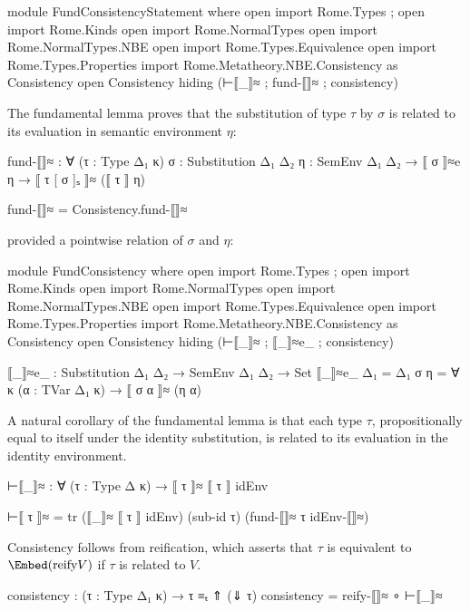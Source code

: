 \begin{AgdaAlign}
\begin{code}[hide] 
module FundConsistencyStatement where
  open import Rome.Types ; open import Rome.Kinds 
  open import Rome.NormalTypes
  open import Rome.NormalTypes.NBE
  open import Rome.Types.Equivalence
  open import Rome.Types.Properties
  import Rome.Metatheory.NBE.Consistency as Consistency
  open Consistency hiding (⊢⟦_⟧≈ ; fund-⟦⟧≈ ; consistency)
\end{code}

The fundamental lemma proves that the substitution of type $\tau$ by $\sigma$ is related to its evaluation in semantic environment $\eta$:

\begin{code}
  fund-⟦⟧≈ : ∀ (τ : Type Δ₁ κ)
            {σ : Substitution Δ₁ Δ₂}
            {η : SemEnv Δ₁ Δ₂} → 
            ⟦ σ ⟧≈e η  → 
            ⟦ τ [ σ ]ₛ ⟧≈ (⟦ τ ⟧ η)
\end{code}
\begin{code}[hide]
  fund-⟦⟧≈ = Consistency.fund-⟦⟧≈
\end{code}

\Ni provided a pointwise relation of $\sigma$ and $\eta$:

\begin{code}[hide] 
module FundConsistency where
  open import Rome.Types ; open import Rome.Kinds 
  open import Rome.NormalTypes
  open import Rome.NormalTypes.NBE
  open import Rome.Types.Equivalence
  open import Rome.Types.Properties
  import Rome.Metatheory.NBE.Consistency as Consistency
  open Consistency hiding (⊢⟦_⟧≈ ; ⟦_⟧≈e_ ; consistency)
\end{code}
\begin{code}
  ⟦_⟧≈e_ : Substitution Δ₁ Δ₂ → SemEnv Δ₁ Δ₂ → Set  
  ⟦_⟧≈e_ {Δ₁ = Δ₁} σ η = 
    ∀ {κ} (α : TVar Δ₁ κ) → ⟦ σ α ⟧≈ (η α)
\end{code}

A natural corollary of the fundamental lemma is that each type $\tau$, propositionally equal to itself under the identity substitution, is related to its evaluation in the identity environment.

\begin{code}
  ⊢⟦_⟧≈ : ∀ (τ : Type Δ κ) → ⟦ τ ⟧≈ ⟦ τ ⟧ idEnv
\end{code}
\begin{code}[hide]
  ⊢⟦ τ ⟧≈ = tr (⟦_⟧≈ ⟦ τ ⟧ idEnv) 
    (sub-id τ) (fund-⟦⟧≈ τ idEnv-⟦⟧≈)
\end{code}

\Ni Consistency follows from reification, which asserts that $\tau$ is equivalent to $\Embed (\text{reify} V)$ if $\tau$ is related to $V$.

\begin{code}
  consistency : (τ : Type Δ₁ κ) → τ ≡ₜ ⇑ (⇓ τ) 
  consistency = reify-⟦⟧≈ ∘ ⊢⟦_⟧≈
\end{code}
\end{AgdaAlign}


